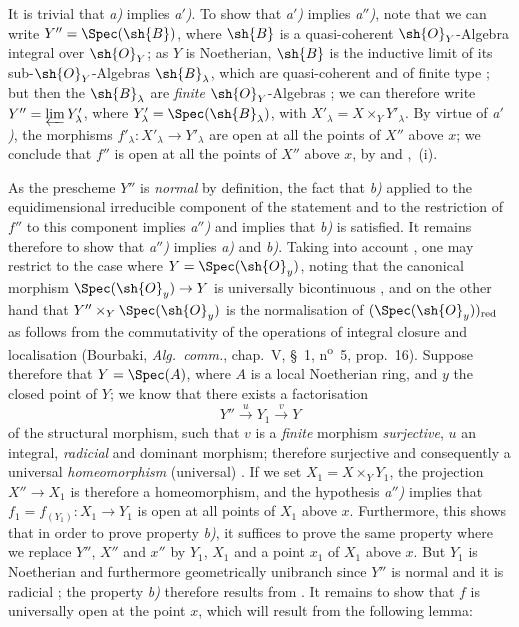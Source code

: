 It is trivial that \emph{a)} implies \emph{a$'$)}.
To show that \emph{a$'$)} implies \emph{a$''$)}, note that we can write $Y''=\Spec(\sh{B})$, where $\sh{B}$ is a quasi-coherent $\sh{O}_Y$-Algebra integral over $\sh{O}_Y$; as $Y$ is Noetherian, $\sh{B}$ is the inductive limit of its sub-$\sh{O}_Y$-Algebras $\sh{B}_\lambda$, which are quasi-coherent and of finite type ; but then the $\sh{B}_\lambda$ are \emph{finite} $\sh{O}_Y$-Algebras ; we can therefore write $Y''=\varprojlim Y'_\lambda$, where $Y'_\lambda=\Spec(\sh{B}_\lambda)$, with $X'_\lambda=X\times_Y Y'_\lambda$.
By virtue of \emph{a$'$)}, the morphisms $f'_\lambda:X'_\lambda\to Y'_\lambda$ are open at all the points of $X''$ above $x$; we conclude that $f''$ is open at all the points of $X''$ above $x$, by  and ,~(i).

As the prescheme $Y''$ is \emph{normal} by definition, the fact that \emph{b)} applied to the equidimensional irreducible component of the statement and to the restriction of $f''$ to this component implies \emph{a$''$)} and implies that \emph{b)} is satisfied.
It remains therefore to show that \emph{a$''$)} implies \emph{a)} and \emph{b)}.
Taking into account , one may restrict to the case where $Y=\Spec(\sh{O}_y)$, noting that the canonical morphism $\Spec(\sh{O}_y)\to Y$ is universally bicontinuous , and on the other hand that $Y''\times_Y\Spec(\sh{O}_y)$ is the normalisation of $(\Spec(\sh{O}_y))_{\mathrm{red}}$ as follows from the commutativity of the operations of integral closure and localisation (Bourbaki, \emph{Alg.\ comm.}, chap.~V, \S~1, n\textsuperscript{o}~5, prop.~16).
Suppose therefore that $Y=\Spec(A)$, where $A$ is a local Noetherian ring, and $y$ the closed point of $Y$; we know  that there exists a factorisation
\[
  Y'' \xrightarrow{u} Y_1 \xrightarrow{v} Y
\]
of the structural morphism, such that $v$ is a \emph{finite} morphism \emph{surjective}, $u$ an integral, \emph{radicial} and dominant morphism; therefore surjective  and consequently a universal \emph{homeomorphism} (universal) .
If we set $X_1=X\times_Y Y_1$, the projection $X''\to X_1$ is therefore a homeomorphism, and the hypothesis \emph{a$''$)} implies that $f_1=f_{(Y_1)}:X_1\to Y_1$ is open at all points of $X_1$ above $x$.
Furthermore, this shows that in order to prove property \emph{b)}, it suffices to prove the same property where we replace $Y''$, $X''$ and $x''$ by $Y_1$, $X_1$ and a point $x_1$ of $X_1$ above $x$.
But $Y_1$ is Noetherian and furthermore geometrically unibranch since $Y''$ is normal and it is radicial ; the property \emph{b)} therefore results from .
It remains to show that $f$ is universally open at the point $x$, which will result from the following lemma:

